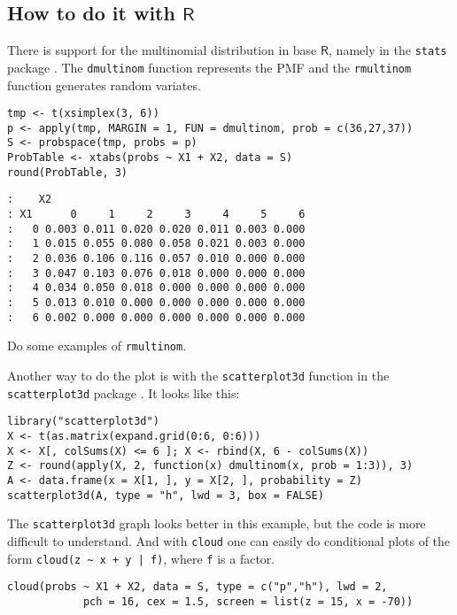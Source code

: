 \subsection{How to do it with \(\mathsf{R}\)}
\label{sec-7-9-1}

There is support for the multinomial distribution in base
\(\mathsf{R}\), namely in the \texttt{stats} package \cite{stats}. The
\texttt{dmultinom} function represents the PMF and the \texttt{rmultinom} function
generates random variates.

\begin{verbatim}
tmp <- t(xsimplex(3, 6))
p <- apply(tmp, MARGIN = 1, FUN = dmultinom, prob = c(36,27,37))
S <- probspace(tmp, probs = p)
ProbTable <- xtabs(probs ~ X1 + X2, data = S)
round(ProbTable, 3)
\end{verbatim}

\begin{verbatim}
:    X2
: X1      0     1     2     3     4     5     6
:   0 0.003 0.011 0.020 0.020 0.011 0.003 0.000
:   1 0.015 0.055 0.080 0.058 0.021 0.003 0.000
:   2 0.036 0.106 0.116 0.057 0.010 0.000 0.000
:   3 0.047 0.103 0.076 0.018 0.000 0.000 0.000
:   4 0.034 0.050 0.018 0.000 0.000 0.000 0.000
:   5 0.013 0.010 0.000 0.000 0.000 0.000 0.000
:   6 0.002 0.000 0.000 0.000 0.000 0.000 0.000
\end{verbatim}

Do some examples of \texttt{rmultinom}.

Another way to do the plot is with the \texttt{scatterplot3d} function in the
\texttt{scatterplot3d} package \cite{scatterplot3d}. It looks like this:
\begin{verbatim}
library("scatterplot3d")
X <- t(as.matrix(expand.grid(0:6, 0:6)))
X <- X[, colSums(X) <= 6 ]; X <- rbind(X, 6 - colSums(X))
Z <- round(apply(X, 2, function(x) dmultinom(x, prob = 1:3)), 3)
A <- data.frame(x = X[1, ], y = X[2, ], probability = Z)
scatterplot3d(A, type = "h", lwd = 3, box = FALSE)
\end{verbatim}
The \texttt{scatterplot3d} graph looks better in this example, but the code
is more difficult to understand. And with \texttt{cloud} one can easily do
conditional plots of the form \texttt{cloud(z \textasciitilde{} x + y | f)}, where \texttt{f} is a
factor.

\begin{verbatim}
cloud(probs ~ X1 + X2, data = S, type = c("p","h"), lwd = 2, 
            pch = 16, cex = 1.5, screen = list(z = 15, x = -70))
\end{verbatim}


